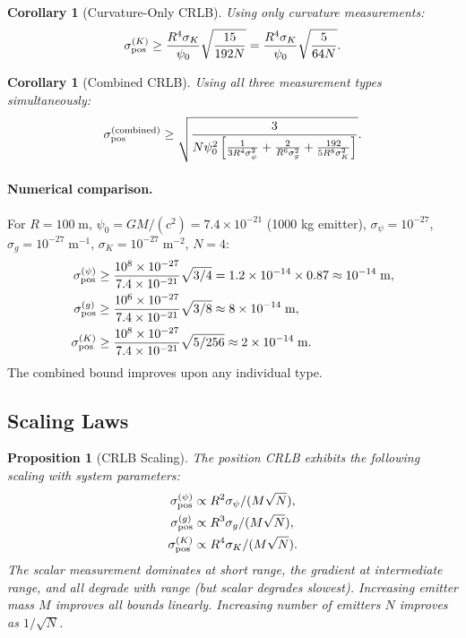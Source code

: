 \documentclass[twocolumn,superscriptaddress,prd,nofootinbib]{revtex4-2}
\newtheorem{proposition}[theorem]{Proposition}
\newtheorem{corollary}[theorem]{Corollary}
\begin{document}
\begin{corollary}[Curvature-Only CRLB]\label{cor:curv-crlb}
Using only curvature measurements:
\begin{equation}
\sigma_{\rm pos}^{(K)} \geq \frac{R^4\sigma_K}{\psi_0}\sqrt{\frac{15}{192 N}}
= \frac{R^4\sigma_K}{\psi_0}\sqrt{\frac{5}{64 N}}.
\label{eq:crlb-curv}
\end{equation}
\end{corollary}

\begin{corollary}[Combined CRLB]\label{cor:combined-crlb}
Using all three measurement types simultaneously:
\begin{equation}
\sigma_{\rm pos}^{\rm (combined)} \geq
\sqrt{\frac{3}{N\psi_0^2\left[
\frac{1}{3R^4\sigma_\psi^2}
+ \frac{2}{R^6\sigma_g^2}
+ \frac{192}{5R^8\sigma_K^2}
\right]}}.
\label{eq:crlb-combined}
\end{equation}
\end{corollary}

\paragraph{Numerical comparison.}
For $R = 100\;\text{m}$, $\psi_0 = GM/(c^2) = 7.4\times 10^{-21}$
(1000 kg emitter), $\sigma_\psi = 10^{-27}$, $\sigma_g = 10^{-27}\;\text{m}^{-1}$,
$\sigma_K = 10^{-27}\;\text{m}^{-2}$, $N = 4$:
\begin{align}
\sigma_{\rm pos}^{(\psi)} &\geq \frac{10^8\times 10^{-27}}{7.4\times 10^{-21}}
\sqrt{3/4} = 1.2\times 10^{-14}\times 0.87 \approx 10^{-14}\;\text{m}, \\
\sigma_{\rm pos}^{(g)} &\geq \frac{10^6\times 10^{-27}}{7.4\times 10^{-21}}
\sqrt{3/8} \approx 8\times 10^{-14}\;\text{m}, \\
\sigma_{\rm pos}^{(K)} &\geq \frac{10^8\times 10^{-27}}{7.4\times 10^{-21}}
\sqrt{5/256} \approx 2\times 10^{-14}\;\text{m}.
\end{align}
The combined bound improves upon any individual type.

\subsection{Scaling Laws}

\begin{proposition}[CRLB Scaling]\label{prop:scaling}
The position CRLB exhibits the following scaling with system parameters:
\begin{align}
\sigma_{\rm pos}^{(\psi)} &\propto R^2\sigma_\psi/(M\sqrt{N}), \label{eq:scale-psi}\\
\sigma_{\rm pos}^{(g)} &\propto R^3\sigma_g/(M\sqrt{N}), \label{eq:scale-grad}\\
\sigma_{\rm pos}^{(K)} &\propto R^4\sigma_K/(M\sqrt{N}). \label{eq:scale-curv}
\end{align}
The scalar measurement dominates at short range, the gradient at
intermediate range, and all degrade with range (but scalar degrades
slowest). Increasing emitter mass $M$ improves all bounds linearly.
Increasing number of emitters $N$ improves as $1/\sqrt{N}$.
\end{proposition}
\end{document}
